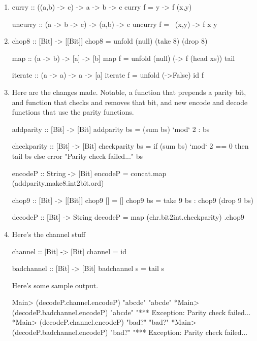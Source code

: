 \documentclass{article}
\begin{document}
\begin{enumerate}
\item 
\begin{code}
curry :: ((a,b) -> c) -> a -> b -> c
curry f = \x y -> f (x,y)

uncurry :: (a -> b -> c) -> (a,b) -> c
uncurry f = \ (x,y) -> f x y
\end{code}

\item 
\begin{code}
chop8 :: [Bit] -> [[Bit]]
chop8 = unfold (null) (take 8) (drop 8)

map :: (a -> b) -> [a] -> [b]
map f = unfold (null) (\xs -> f (head xs)) tail

iterate :: (a -> a) -> a -> [a]
iterate f = unfold (\x->False) id f
\end{code}

\item Here are the changes made. Notable, a function that prepends a parity bit, and function that checks and removes that bit, and new encode and decode functions that use the parity functions. 
\begin{code}
addparity :: [Bit] -> [Bit]
addparity bs = (sum bs) `mod` 2 : bs

checkparity :: [Bit] -> [Bit]
checkparity bs = if (sum bs) `mod` 2 == 0 then tail bs else error "Parity check failed..." bs

encodeP :: String -> [Bit]
encodeP = concat.map (addparity.make8.int2bit.ord)

chop9 :: [Bit] -> [[Bit]]
chop9 [] = []
chop9 bs = take 9 bs : chop9 (drop 9 bs)

decodeP :: [Bit] -> String
decodeP = map (chr.bit2int.checkparity) .chop9
\end{code}

\item Here's the channel stuff
\begin{code}
channel :: [Bit] -> [Bit]
channel = id

badchannel :: [Bit] -> [Bit]
badchannel s = tail s
\end{code}
Here's some sample output.
\begin{code}
Main> (decodeP.channel.encodeP) "abcde"
"abcde"
*Main> (decodeP.badchannel.encodeP) "abcde"
"*** Exception: Parity check failed...
*Main> (decodeP.channel.encodeP) "bad?"
"bad?"
*Main> (decodeP.badchannel.encodeP) "bad?"
"*** Exception: Parity check failed...
\end{code}
\end{enumerate}
\end{document}
